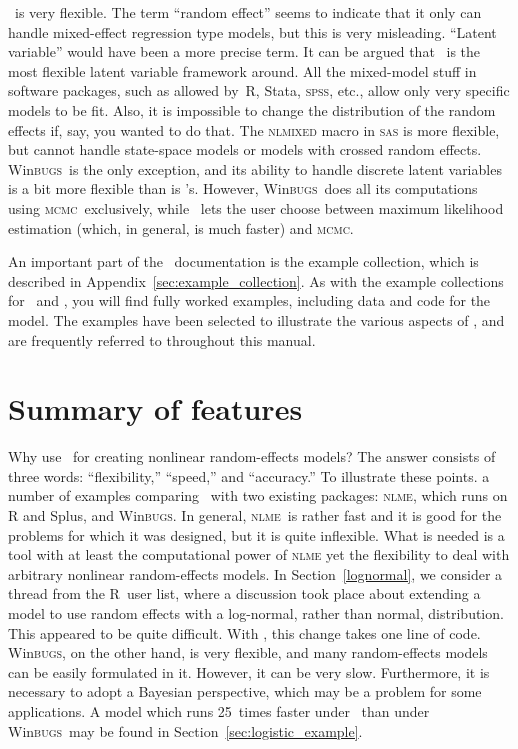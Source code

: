 \documentclass{admbmanual}
\newcommand{\scMCMC}{\textsc{mcmc}}
\newcommand{\scNLME}{\textsc{nlme}}
\newcommand{\scWinBUGS}{Win\textsc{bugs}}
\begin{document}
\scAR\ is very flexible. The term ``random effect'' seems to indicate that it
only can handle mixed-effect regression type models, but this is very
misleading. ``Latent variable'' would have been a more precise term. It can be
argued that \scAR\ is the most flexible latent variable framework around. All
the mixed-model stuff in software packages, such as allowed by~R, Stata,
\textsc{spss}, etc., allow only very specific models to be fit. Also, it is
impossible to change the distribution of the random effects if, say, you wanted
to do that. The \textsc{nlmixed} macro in \textsc{sas} is more flexible, but
cannot handle state-space models or models with crossed random effects.
\scWinBUGS\ is the only exception, and its ability to handle discrete latent
variables is a bit more flexible than is \scAR's. However, \scWinBUGS\ does all
its computations using \scMCMC\ exclusively, while \scAR\ lets the user choose
between maximum likelihood estimation (which, in general, is much faster) and
\scMCMC.

An important part of the \scAR\ documentation is the example collection, which
is described in Appendix~\ref{sec:example_collection}. As with the example
collections for \scAB\ and \scAD, you will find fully worked examples, including
data and code for the model. The examples have been selected to illustrate the
various aspects of \scAR, and are frequently referred to throughout this manual.

\section{Summary of features}

Why use \ADM\ for creating nonlinear random-effects models? The answer consists
of three words: ``flexibility,'' ``speed,'' and ``accuracy.'' To illustrate
these points. a number of examples comparing \scAR\ with two existing packages:
\textsc{nlme}, which runs on R and Splus, and \scWinBUGS. In general, \scNLME\
is rather fast and it is good for the problems for which it was designed, but it
is quite inflexible. What is needed is a tool with at least the computational
power of \textsc{nlme} yet the flexibility to deal with arbitrary nonlinear
random-effects models. In Section~\ref{lognormal}, we consider a thread from the
R~user list, where a discussion took place about extending a model to use random
effects with a log-normal, rather than normal, distribution. This appeared to be
quite difficult. With \scAR, this change takes one line of code. \scWinBUGS, on
the other hand, is very flexible, and many random-effects models can be easily
formulated in it. However, it can be very slow. Furthermore, it is necessary to
adopt a Bayesian perspective, which may be a problem for some applications. A
model which runs 25~times faster under \scAB\ than under \scWinBUGS\ may be
found in Section~\ref{sec:logistic_example}.
\end{document}
